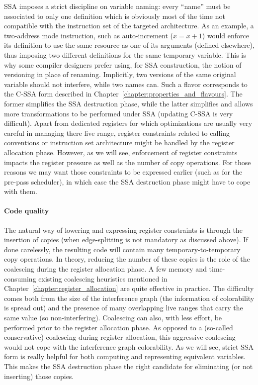 SSA imposes a strict discipline on variable naming: 
every ``name'' must be associated to only one definition which is obviously most of the time not compatible with the instruction set of the targeted architecture. 
As an example, a two-address mode instruction, such as auto-increment ($x=x+1$) would enforce its definition to use the same resource as one of its arguments (defined elsewhere), thus imposing two different definitions for the same temporary variable. 
This is why some compiler designers prefer using, for SSA construction, the notion of versioning in place of renaming. 
Implicitly, two versions of the same original variable should not interfere, while two names can.
Such a flavor corresponds to the C-SSA form  described in Chapter~\ref{chapter:properties_and_flavours}.
The former simplifies the SSA destruction phase, while the latter simplifies and allows more transformations to be performed under SSA (updating C-SSA is very difficult). 
Apart from dedicated registers for which optimizations are usually very careful in managing there live range, register constraints related to calling conventions or instruction set architecture might be handled by the register allocation phase. 
However, as we will see, enforcement of register constraints impacts the register pressure as well as the number of copy operations. 
For those reasons we may want those constraints to be expressed earlier (such as for the pre-pass scheduler), in which case the SSA destruction phase might have to cope with them.

\paragraph{Code quality}
The natural way of lowering \phifuns{} and expressing register constraints is through the insertion of copies (when edge-splitting is not mandatory as discussed above). 
If done carelessly, the resulting code will contain many temporary-to-temporary copy operations. 
In theory, reducing the number of these copies is the role of the coalescing during the register allocation phase. 
A few memory and time-consuming existing coalescing heuristics mentioned in Chapter~\ref{chapter:register_allocation} are quite effective in practice. 
The difficulty comes both from the size of the interference graph (the information of colorability is spread out) and the presence of many overlapping live ranges that carry the same value (so non-interfering). 
Coalescing can also, with less effort, be performed prior to the register allocation phase. 
As opposed to a (so-called conservative) coalescing during register allocation, this aggressive coalescing would not cope with the interference graph colorability. 
As we will see, strict SSA form is really helpful for both computing and representing equivalent variables. 
This makes the SSA destruction phase the right candidate for eliminating (or not inserting) those copies.

